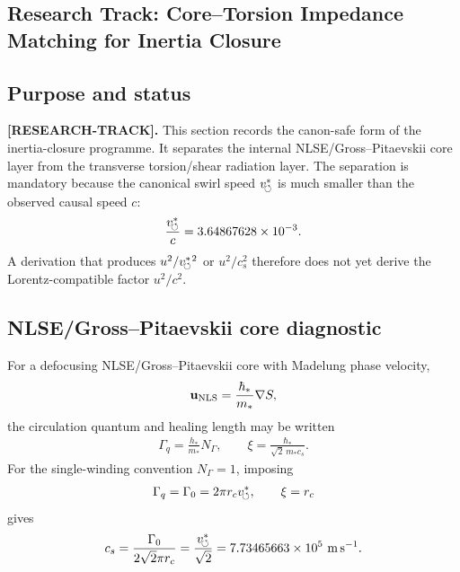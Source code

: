 \subsection{Research Track: Core--Torsion Impedance Matching for Inertia Closure}
\label{sec:rt_core_torsion_impedance_matching}

\subsection{Purpose and status}

\textbf{[RESEARCH-TRACK].}
This section records the canon-safe form of the inertia-closure programme. It separates the internal NLSE/Gross--Pitaevskii core layer from the transverse torsion/shear radiation layer. The separation is mandatory because the canonical swirl speed \(v_{\!\boldsymbol{\circlearrowleft}}^{\ast}\) is much smaller than the observed causal speed \(c\):
\begin{align}
    \frac{v_{\!\boldsymbol{\circlearrowleft}}^{\ast}}{c}=3.64867628\times10^{-3}.
\end{align}
A derivation that produces \(u^2/v_{\!\boldsymbol{\circlearrowleft}}^{\ast}{}^2\) or \(u^2/c_s^2\) therefore does not yet derive the Lorentz-compatible factor \(u^2/c^2\).

\subsection{NLSE/Gross--Pitaevskii core diagnostic}

For a defocusing NLSE/Gross--Pitaevskii core with Madelung phase velocity,
\begin{align}
    \mathbf u_{\rm NLS}=\frac{\hbar_*}{m_*}\nabla S,
\end{align}
the circulation quantum and healing length may be written
\begin{align}
    \Gamma_q = \frac{h_*}{m_*}N_\Gamma,
    \qquad
    \xi = \frac{\hbar_*}{\sqrt{2}\,m_*c_s}.
\end{align}
For the single-winding convention \(N_\Gamma=1\), imposing
\begin{align}
    \Gamma_q=\Gamma_0=2\pi r_cv_{\!\boldsymbol{\circlearrowleft}}^{\ast},
    \qquad
    \xi=r_c
\end{align}
gives
\begin{align}
    c_s
    =
    \frac{\Gamma_0}{2\sqrt{2}\pi r_c}
    =
    \frac{v_{\!\boldsymbol{\circlearrowleft}}^{\ast}}{\sqrt{2}}
    =
    7.73465663\times10^{5}\ \mathrm{m\,s^{-1}}.
    \label{eq:rt_core_torsion_cs}
\end{align}

